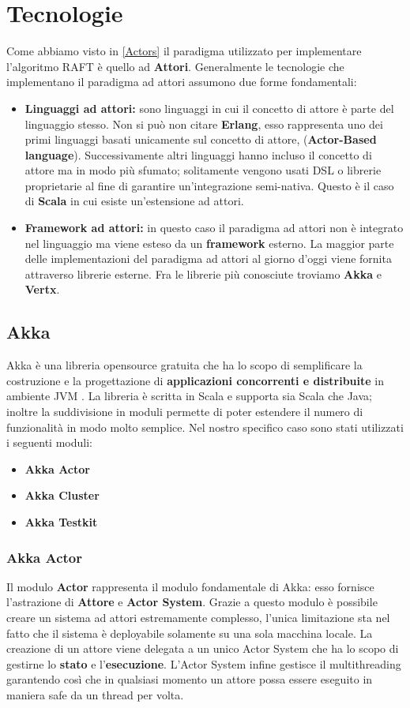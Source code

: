 \section{Tecnologie}
Come abbiamo visto in \ref{Actors} il paradigma utilizzato per implementare l'algoritmo RAFT è quello ad \textbf{Attori}. Generalmente le tecnologie che implementano il paradigma ad attori assumono due forme fondamentali:
\begin{itemize}
  \item{\textbf{Linguaggi ad attori:}}
  sono linguaggi in cui il concetto di attore è parte del linguaggio stesso. Non si può non citare \textbf{Erlang}, esso rappresenta uno dei primi linguaggi basati unicamente sul concetto di attore, (\textbf{Actor-Based language}). Successivamente altri linguaggi hanno incluso il concetto di attore ma in modo più sfumato; solitamente vengono usati DSL o librerie proprietarie al fine di garantire un'integrazione semi-nativa. Questo è il caso di \textbf{Scala} in cui esiste un'estensione ad attori.
  \item{\textbf{Framework ad attori:}}
  in questo caso il paradigma ad attori non è integrato nel linguaggio ma viene esteso da un \textbf{framework} esterno. La maggior parte delle implementazioni del paradigma ad attori al giorno d'oggi viene fornita attraverso librerie esterne. Fra le librerie più conosciute troviamo \textbf{Akka} e \textbf{Vertx}.
\end{itemize}

\subsection{Akka}
Akka è una libreria opensource gratuita che ha lo scopo di semplificare la costruzione e la progettazione di \textbf{applicazioni concorrenti e distribuite} in ambiente JVM \cite{akkaSite}. La libreria è scritta in Scala e supporta sia Scala che Java; inoltre la suddivisione in moduli permette di poter estendere il numero di funzionalità in modo molto semplice. Nel nostro specifico caso sono stati utilizzati i seguenti moduli:
\begin{itemize}
  \item{\textbf{Akka Actor}}
  \item{\textbf{Akka Cluster}}
  \item{\textbf{Akka Testkit}}
\end{itemize} 

  \subsubsection{Akka Actor}
  Il modulo \textbf{Actor} rappresenta il modulo fondamentale di Akka: esso fornisce l'astrazione di \textbf{Attore} e \textbf{Actor System}. Grazie a questo modulo è possibile creare un sistema ad attori estremamente complesso, l'unica limitazione sta nel fatto che il sistema è deployabile solamente su una sola macchina locale. La creazione di un attore viene delegata a un unico Actor System che ha lo scopo di gestirne lo \textbf{stato} e l'\textbf{esecuzione}. L'Actor System infine gestisce il multithreading garantendo così che in qualsiasi momento un attore possa essere eseguito in maniera safe da un thread per volta.   
